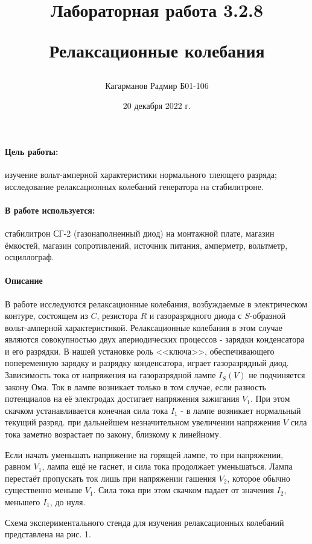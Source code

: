 \documentclass[a4paper,12pt]{article}
\title{Лабораторная работа 3.2.8

Релаксационные колебания}
\author{Кагарманов Радмир Б01-106}
\date{20 декабря 2022 г.}
\begin{document}
\maketitle
\thispagestyle{empty}
\newpage
\setcounter{page}{1}

\paragraph{Цель работы:} изучение вольт-амперной характеристики нормального тлеющего разряда; исследование релаксационных колебаний генератора на стабилитроне.

\paragraph{В работе используется:} стабилитрон СГ-2 (газонаполненный диод) на монтажной плате, магазин ёмкостей, магазин сопротивлений, источник питания, амперметр, вольтметр, осциллограф.

\paragraph{Описание\\}
В работе исследуются релаксационные колебания, возбуждаемые в электрическом контуре, состоящем из $C$, резистора $R$ и газоразрядного диода с $S$-образной вольт-амперной характеристикой. Релаксационные колебания в этом случае являются совокупностью двух апериодических процессов - зарядки конденсатора и его разрядки. В нашей установке роль <<ключа>>, обеспечивающего попеременную зарядку и разрядку конденсатора, играет газоразрядный диод. Зависимость тока от напряжения на газоразрядной лампе $I_{S}(V)$ не подчиняется закону Ома. Ток в лампе возникает только в том случае, если разность потенциалов на её электродах достигает напряжения зажигания $V_1$. При этом скачком устанавливается конечная сила тока $I_1$ - в лампе возникает нормальный текущий разряд. при дальнейшем незначительном увеличении напряжения $V$ сила тока заметно возрастает по закону, близкому к линейному.\par 
Если начать уменьшать напряжение на горящей лампе, то при напряжении, равном $V_1$, лампа ещё не гаснет, и сила тока продолжает уменьшаться. Лампа перестаёт пропускать ток лишь при напряжении гашения $V_2$, которое обычно существенно меньше $V_1$. Сила тока при этом скачком падает от значения $I_2$, меньшего $I_1$, до нуля. \par
Схема экспериментального стенда для изучения релаксационных колебаний представлена на рис. 1. 
\end{document}
